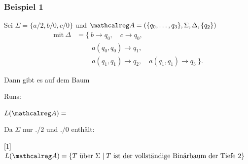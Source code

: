     \begin{frame}
      \frametitle{Beispiel 1}

      \begin{Itemize}
        \item
          Sei $\Sigma = \{a/2, b/0, c/0\}$ und $\Aut{A} = (\{q_0,\dots,q_3\}, \Sigma, \Delta, \{q_2\})$
          \begin{align*}
            \text{mit}~ \Delta & = \{~b \to q_0,\quad c \to q_0, \\
                               & \qquad ~a(q_0,q_0) \to q_1,      \\
                               & \qquad ~a(q_1,q_1) \to q_2,\quad a(q_1,q_1) \to q_3~\}.
          \end{align*}
          \par\smallskip
        \item<2->
          Dann gibt es auf dem Baum
          \begin{center}
            \begin{minipage}{.21\textwidth}
            \end{minipage}
             Runs:
            \quad
          \end{center}
          \par\bigskip
        \item<6->
          $L(\Aut{A}) =$
          \par\bigskip
        \item<8->
           Da $\Sigma$ nur $./2$ und $./0$ enthält:
          \par\smallskip
          \scalebox{.95}[1]{%
            $L(\Aut{A}) = \{T \text{~über~} \Sigma \mid T \text{~ist der vollständige Binärbaum der Tiefe 2}\}$%
          }
      \end{Itemize}

    \end{frame}

